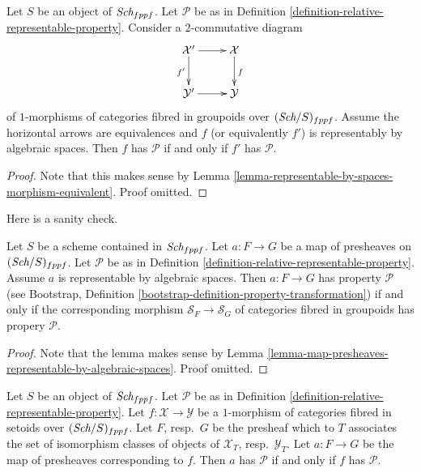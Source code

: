 \begin{lemma}
\label{lemma-property-morphism-equivalent}
Let $S$ be an object of $\textit{Sch}_{fppf}$.
Let $\mathcal{P}$ be as in
Definition \ref{definition-relative-representable-property}.
Consider a $2$-commutative diagram
$$
\xymatrix{
\mathcal{X}' \ar[r] \ar[d]_{f'} & \mathcal{X} \ar[d]^f \\
\mathcal{Y}' \ar[r] & \mathcal{Y}
}
$$
of $1$-morphisms of categories fibred in groupoids over
$(\textit{Sch}/S)_{fppf}$.
Assume the horizontal arrows are equivalences and $f$ (or equivalently $f'$)
is representably by algebraic spaces.
Then $f$ has $\mathcal{P}$ if and only if $f'$ has $\mathcal{P}$.
\end{lemma}

\begin{proof}
Note that this makes sense by
Lemma \ref{lemma-representable-by-spaces-morphism-equivalent}.
Proof omitted.
\end{proof}

\noindent
Here is a sanity check.

\begin{lemma}
\label{lemma-map-presheaves-representable-by-spaces-transformation-property}
Let $S$ be a scheme contained in $\textit{Sch}_{fppf}$.
Let $a : F \to G$ be a map of presheaves on $(\textit{Sch}/S)_{fppf}$.
Let $\mathcal{P}$ be as in
Definition \ref{definition-relative-representable-property}.
Assume $a$ is representable by algebraic spaces.
Then $a : F \to G$ has property $\mathcal{P}$ (see
Bootstrap, Definition \ref{bootstrap-definition-property-transformation})
if and only if the corresponding morphism
$\mathcal{S}_F \to \mathcal{S}_G$ of categories fibred in groupoids
has propery $\mathcal{P}$.
\end{lemma}

\begin{proof}
Note that the lemma makes sense by
Lemma \ref{lemma-map-presheaves-representable-by-algebraic-spaces}.
Proof omitted.
\end{proof}

\begin{lemma}
\label{lemma-map-fibred-setoids-property}
Let $S$ be an object of $\textit{Sch}_{fppf}$. Let $\mathcal{P}$ be as in
Definition \ref{definition-relative-representable-property}.
Let $f : \mathcal{X} \to \mathcal{Y}$ be a $1$-morphism of
categories fibred in setoids over $(\textit{Sch}/S)_{fppf}$.
Let $F$, resp.\ $G$ be the presheaf which to $T$ associates
the set of isomorphism classes of objects of
$\mathcal{X}_T$, resp.\ $\mathcal{Y}_T$.
Let $a : F \to G$ be the map of presheaves corresponding to $f$.
Then $a$ has $\mathcal{P}$ if and only if $f$ has $\mathcal{P}$.
\end{lemma}

